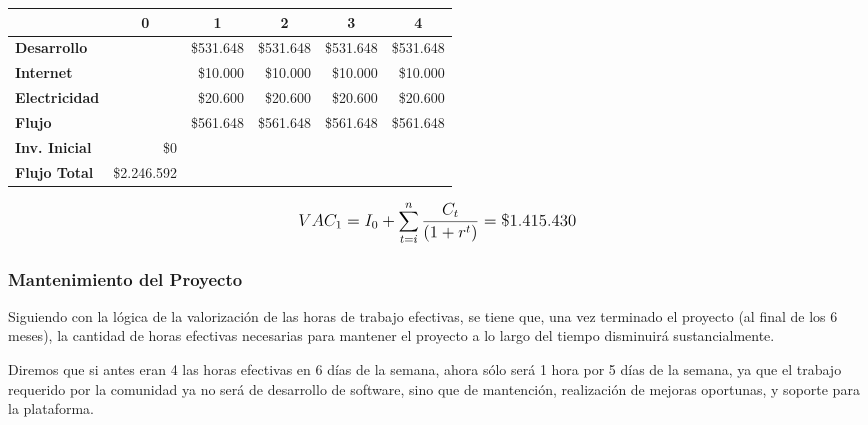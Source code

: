 \begin{center}
	\begin{tabular}{ | l | l | l | l | l | l | }
		\hline
		 & \multicolumn{1}{|c|}{\textbf{0}} & \multicolumn{1}{|c|}{\textbf{1}} & \multicolumn{1}{|c|}{\textbf{2}} & \multicolumn{1}{|c|}{\textbf{3}} & \multicolumn{1}{|c|}{\textbf{4}} \\
		\hline
		{\textbf{Desarrollo}} &  & \multicolumn{1}{|r|}{\$531.648} & \multicolumn{1}{|r|}{\$531.648} & \multicolumn{1}{|r|}{\$531.648} & \multicolumn{1}{|r|}{\$531.648} \\ \hline
		
		{\textbf{Internet}} &  & \multicolumn{1}{|r|}{\$10.000} & \multicolumn{1}{|r|}{\$10.000} & \multicolumn{1}{|r|}{\$10.000} & \multicolumn{1}{|r|}{\$10.000} \\ \hline
		
		{\textbf{Electricidad}} &  & \multicolumn{1}{|r|}{\$20.600} & \multicolumn{1}{|r|}{\$20.600} & \multicolumn{1}{|r|}{\$20.600} & \multicolumn{1}{|r|}{\$20.600} \\ \hline
		
		{\textbf{Flujo}} &  & \multicolumn{1}{|r|}{\$561.648} & \multicolumn{1}{|r|}{\$561.648} & \multicolumn{1}{|r|}{\$561.648} & \multicolumn{1}{|r|}{\$561.648} \\ \hline
		{\textbf{Inv. Inicial}}& \multicolumn{1}{|r|}{\$0} & & & & \\ \hline
		\textbf{Flujo Total} & \multicolumn{1}{|r|}{\$2.246.592} & & & & \\ \hline
	\end{tabular}
\end{center}

\[
\mathlarger{
	{VAC_{1}} = I_0 + \sum\limits_{t=i}^{n}\frac{C_t}{\left(1+r^t\right)} = \$1.415.430
}
\]

\subsubsection{Mantenimiento del Proyecto}
Siguiendo con la lógica de la valorización de las horas de trabajo efectivas, se tiene que, una vez terminado el proyecto (al final de los 6 meses), la cantidad de horas efectivas necesarias para mantener el proyecto a lo largo del tiempo disminuirá sustancialmente.

Diremos que si antes eran 4 las horas efectivas en 6 días de la semana, ahora sólo será 1 hora por 5 días de la semana, ya que el trabajo requerido por la comunidad ya no será de desarrollo de software, sino que de mantención, realización de mejoras oportunas, y soporte para la plataforma.

